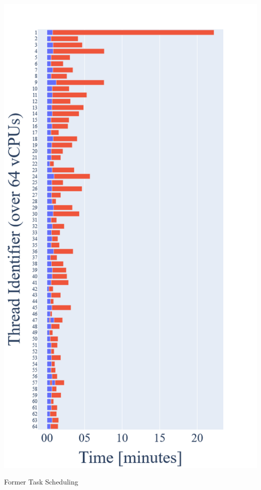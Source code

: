 \begin{marginfigure}[*-5]
  \centering
  \includegraphics[width=\textwidth]{figures/old}
  \caption{Former Task Scheduling}
\end{marginfigure}

